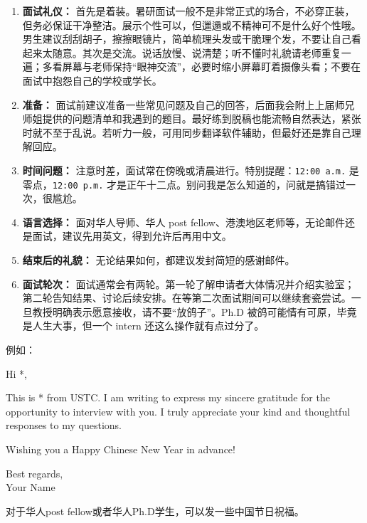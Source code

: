 \begin{enumerate}
    \item \textbf{面试礼仪：} 首先是着装。暑研面试一般不是非常正式的场合，不必穿正装，但务必保证干净整洁。展示个性可以，但邋遢或不精神可不是什么好个性哦。男生建议刮刮胡子，擦擦眼镜片，简单梳理头发或干脆理个发，不要让自己看起来太随意。其次是交流。说话放慢、说清楚；听不懂时礼貌请老师重复一遍；多看屏幕与老师保持“眼神交流”，必要时缩小屏幕盯着摄像头看；不要在面试中抱怨自己的学校或学长。
    
    \item \textbf{准备：} 面试前建议准备一些常见问题及自己的回答，后面我会附上上届师兄师姐提供的问题清单和我遇到的题目。最好练到脱稿也能流畅自然表达，紧张时就不至于乱说。若听力一般，可用同步翻译软件辅助，但最好还是靠自己理解回应。
    
    \item \textbf{时间问题：} 注意时差，面试常在傍晚或清晨进行。特别提醒：\lstinline{12:00 a.m.} 是零点，\lstinline{12:00 p.m.} 才是正午十二点。别问我是怎么知道的，问就是搞错过一次，很尴尬。
    
    \item \textbf{语言选择：} 面对华人导师、华人 post fellow、港澳地区老师等，无论邮件还是面试，建议先用英文，得到允许后再用中文。
    
    \item \textbf{结束后的礼貌：} 无论结果如何，都建议发封简短的感谢邮件。
    
    \item \textbf{面试轮次：} 面试通常会有两轮。第一轮了解申请者大体情况并介绍实验室；第二轮告知结果、讨论后续安排。在等第二次面试期间可以继续套瓷尝试。一旦教授明确表示愿意接收，请不要“放鸽子”。Ph.D 被鸽可能情有可原，毕竟是人生大事，但一个 intern 还这么操作就有点过分了。
\end{enumerate}

    例如： 
    
\begin{presentbox}
\noindent Hi *,

\noindent This is * from USTC. I am writing to express my sincere gratitude for the opportunity to interview with you. I truly appreciate your kind and thoughtful responses to my questions.

\noindent Wishing you a Happy Chinese New Year in advance!

\noindent Best regards,\\
\noindent Your Name
\end{presentbox}

对于华人post fellow或者华人Ph.D学生，可以发一些中国节日祝福。

